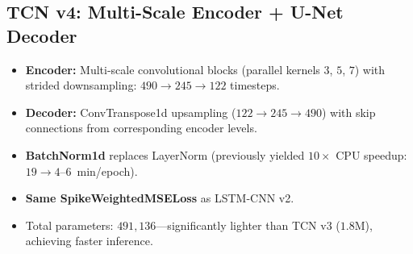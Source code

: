 \documentclass[10pt,journal,compsoc]{IEEEtran}
\begin{document}
\subsection{TCN v4: Multi-Scale Encoder + U-Net Decoder}
\label{sec:tcn}
\begin{itemize}
    \item \textbf{Encoder:} Multi-scale convolutional blocks (parallel kernels $3$, $5$, $7$) with strided downsampling: $490 \to 245 \to 122$ timesteps.
    \item \textbf{Decoder:} ConvTranspose1d upsampling ($122 \to 245 \to 490$) with skip connections from corresponding encoder levels.
    \item \textbf{BatchNorm1d} replaces LayerNorm (previously yielded $10\times$ CPU speedup: $19 \to 4$--$6$~min/epoch).
    \item \textbf{Same SpikeWeightedMSELoss} as LSTM-CNN v2.
    \item Total parameters: $491{,}136$---significantly lighter than TCN v3 ($1.8$M), achieving faster inference.
\end{itemize}
\end{document}
